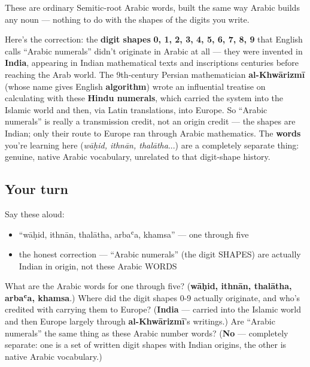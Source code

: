 These are ordinary Semitic-root Arabic words, built the same way Arabic builds any noun — nothing to do with the shapes of the digits you write.

\begin{culture}
Here's the correction: the \textbf{digit shapes} \textbf{0, 1, 2, 3, 4, 5, 6, 7, 8, 9} that English calls \textquotedblleft{}Arabic numerals\textquotedblright{} didn't originate in Arabic at all — they were invented in \textbf{India}, appearing in Indian mathematical texts and inscriptions centuries before reaching the Arab world. The 9th-century Persian mathematician \textbf{al-Khwārizmī} (whose name gives English \textbf{algorithm}) wrote an influential treatise on calculating with these \textbf{Hindu numerals}, which carried the system into the Islamic world and then, via Latin translations, into Europe. So \textquotedblleft{}Arabic numerals\textquotedblright{} is really a transmission credit, not an origin credit — the shapes are Indian; only their route to Europe ran through Arabic mathematics. The \textbf{words} you're learning here (\emph{wāḥid, ithnān, thalātha}...) are a completely separate thing: genuine, native Arabic vocabulary, unrelated to that digit-shape history.
\end{culture}

\subsection*{Your turn}
Say these aloud:

\begin{itemize}
\raggedright
  \item \textquotedblleft{}wāḥid, ithnān, thalātha, arbaʿa, khamsa\textquotedblright{} — one through five
  \item the honest correction — \textquotedblleft{}Arabic numerals\textquotedblright{} (the digit SHAPES) are actually Indian in origin, not these Arabic WORDS
\end{itemize}

\begin{tcolorbox}[breakable,colback=teal!4,colframe=teal!35!black,title={Before you move on}]
What are the Arabic words for one through five? (\textbf{wāḥid, ithnān, thalātha, arbaʿa, khamsa}.) Where did the digit shapes 0-9 actually originate, and who's credited with carrying them to Europe? (\textbf{India} — carried into the Islamic world and then Europe largely through \textbf{al-Khwārizmī}'s writings.) Are \textquotedblleft{}Arabic numerals\textquotedblright{} the same thing as these Arabic number words? (\textbf{No} — completely separate: one is a set of written digit shapes with Indian origins, the other is native Arabic vocabulary.)
\end{tcolorbox}
